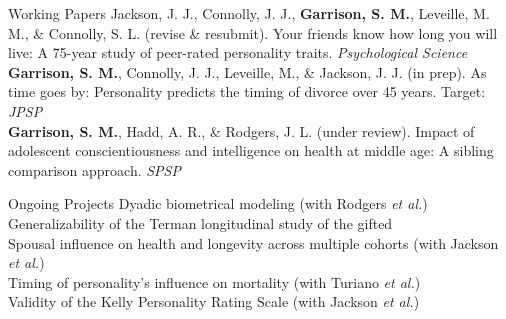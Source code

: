 \documentclass {resume}
\begin{document}
\begin{rSection}{\textrm{Working Papers}}%
Jackson, J. J., Connolly, J. J., {\bf Garrison, S. M.}, Leveille, M. M., \& Connolly, S. L. (revise \& resubmit). Your \hspace* {6 mm}friends know how long you will live: A 75-year study of peer-rated personality traits. \textit{Psychological Science}\smallskip\\
{\bf Garrison, S. M.}, Connolly, J. J., Leveille, M., \& Jackson, J. J. (in prep). As time goes by: Personality predicts the \hspace* {6 mm}timing of divorce over 45 years. Target: \textit{JPSP}\smallskip\\
{\bf Garrison, S. M.}, Hadd, A. R., \& Rodgers, J. L. (under review). Impact of adolescent conscientiousness and \hspace* {6 mm}intelligence on health at middle age: A sibling comparison approach. \textit{SPSP}
\end{rSection}\newpage
\begin{rSection}{\textrm{Ongoing Projects}}
Dyadic biometrical modeling (with Rodgers \textit{et al.})\smallskip\\
Generalizability of the Terman longitudinal study of the gifted\smallskip\\
Spousal influence on health and longevity across multiple cohorts (with Jackson \textit{et al.})\smallskip\\
Timing of personality's influence on mortality (with Turiano \textit{et al.})\smallskip\\
Validity of the Kelly Personality Rating Scale (with Jackson \textit{et al.})
\end{rSection}
\end{document}
